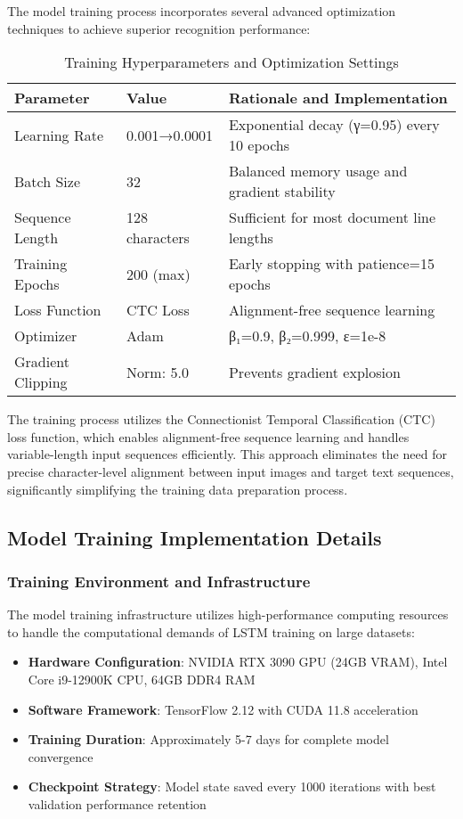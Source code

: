 The model training process incorporates several advanced optimization techniques to achieve superior recognition performance:

\begin{table}[H]
\centering
\caption{Training Hyperparameters and Optimization Settings}
\label{tab:training_config}
\begin{tabular}{|l|l|p{6cm}|}
\hline
\textbf{Parameter} & \textbf{Value} & \textbf{Rationale and Implementation} \\
\hline
Learning Rate & 0.001→0.0001 & Exponential decay (γ=0.95) every 10 epochs \\
\hline
Batch Size & 32 & Balanced memory usage and gradient stability \\
\hline
Sequence Length & 128 characters & Sufficient for most document line lengths \\
\hline
Training Epochs & 200 (max) & Early stopping with patience=15 epochs \\
\hline
Loss Function & CTC Loss & Alignment-free sequence learning \\
\hline
Optimizer & Adam & β₁=0.9, β₂=0.999, ε=1e-8 \\
\hline
Gradient Clipping & Norm: 5.0 & Prevents gradient explosion \\
\hline
\end{tabular}
\end{table}

The training process utilizes the Connectionist Temporal Classification (CTC) loss function, which enables alignment-free sequence learning and handles variable-length input sequences efficiently. This approach eliminates the need for precise character-level alignment between input images and target text sequences, significantly simplifying the training data preparation process.

\subsection{Model Training Implementation Details}

\subsubsection{Training Environment and Infrastructure}

The model training infrastructure utilizes high-performance computing resources to handle the computational demands of LSTM training on large datasets:

\begin{itemize}
\item \textbf{Hardware Configuration}: NVIDIA RTX 3090 GPU (24GB VRAM), Intel Core i9-12900K CPU, 64GB DDR4 RAM
\item \textbf{Software Framework}: TensorFlow 2.12 with CUDA 11.8 acceleration
\item \textbf{Training Duration}: Approximately 5-7 days for complete model convergence
\item \textbf{Checkpoint Strategy}: Model state saved every 1000 iterations with best validation performance retention
\end{itemize}

